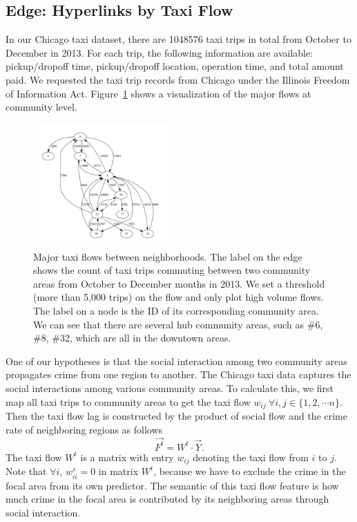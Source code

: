 \subsection{Edge: Hyperlinks by Taxi Flow}

In our Chicago taxi dataset, there are \num{1048576} taxi trips in total from October to December in 2013. For each trip, the following information are available: pickup/dropoff time, pickup/dropoff location, operation time, and total amount paid. We requested the taxi trip records from Chicago under the Illinois Freedom of Information Act.  Figure~\ref{fig:taxi-flow} shows a visualization of the major flows at community level.

\begin{figure}[htb]
\centering
\includegraphics[width=0.46\textwidth]{fig/taxiflow.pdf}
\caption{Major taxi flows between neighborhoods. The label on the edge shows the count of taxi trips  commuting between two community areas from October to December months in 2013. We set a threshold (more than 5,000 trips) on the flow and only plot high volume flows. The label on a node is the ID of its corresponding community area. We can see that there are several hub community areas, such as \#6, \#8, \#32, which are all in the downtown areas. }
\label{fig:taxi-flow}
\end{figure}


One of our hypotheses is that the social interaction among two community areas propagates crime from one region to another.
The Chicago taxi data captures the social interactions among various community areas. To calculate this, we first map all taxi trips to community areas to get the taxi flow $w_{ij}\ \forall i,j \in \{1, 2, \cdots n\}$. Then the taxi flow lag is constructed by the product of social flow and the crime rate of neighboring regions as follows
\begin{equation}
\vec{F^t} = W^t \cdot \vec{Y}.
\label{eq:taxi}
\end{equation}
The taxi flow $W^t$ is a matrix with entry $w_{ij}$ denoting the taxi flow from $i$ to $j$. Note that $\forall i$, $w^s_{ii} = 0$ in matrix $W^t$, because we have to exclude the crime in the focal area from its own predictor. The semantic of this taxi flow feature is how much crime in the focal area is contributed by its neighboring areas through social interaction.

